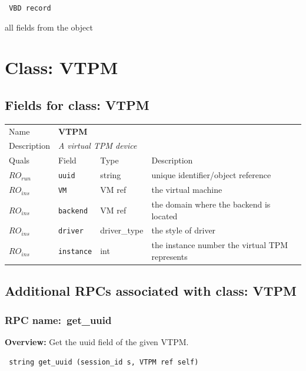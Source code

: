 \vspace{0.3cm}

{\tt 
VBD record
}


all fields from the object
\vspace{0.3cm}
\vspace{0.3cm}
\vspace{0.3cm}

\vspace{1cm}
\newpage
\section{Class: VTPM}
\subsection{Fields for class: VTPM}
\begin{longtable}{|lllp{}|}
\hline
\multicolumn{1}{|l}{Name} & \multicolumn{3}{l|}{\bf VTPM} \\
\multicolumn{1}{|l}{Description} & \multicolumn{3}{l|}{\parbox{11cm}{\em A virtual TPM device}} \\
\hline
Quals & Field & Type & Description \\
\hline
$\mathit{RO}_\mathit{run}$ &  {\tt uuid} & string & unique identifier/object reference \\
$\mathit{RO}_\mathit{ins}$ &  {\tt VM} & VM ref & the virtual machine \\
$\mathit{RO}_\mathit{ins}$ &  {\tt backend} & VM ref & the domain where the backend is located \\
$\mathit{RO}_\mathit{ins}$ &  {\tt driver} & driver\_type & the style of driver \\
$\mathit{RO}_\mathit{ins}$ &  {\tt instance} & int & the instance number the virtual TPM represents \\
\hline
\end{longtable}
\subsection{Additional RPCs associated with class: VTPM}
\subsubsection{RPC name:~get\_uuid}

{\bf Overview:} 
Get the uuid field of the given VTPM.

\begin{verbatim} string get_uuid (session_id s, VTPM ref self)\end{verbatim}


